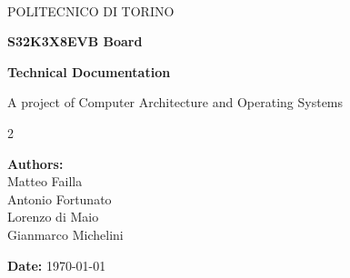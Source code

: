 
\begin{titlepage}
    \

\vspace{20mm}

\begin{center}
    {\LARGE POLITECNICO DI TORINO}
    \vspace{3cm}

    {\LARGE \textbf{S32K3X8EVB Board}}
    \vspace{0.5cm}

    {\LARGE \textbf{Technical Documentation}}
    \vspace{2cm}

    {\large A project of Computer Architecture and Operating Systems}
\end{center}

\vfill

    \begin{multicols}{2}
        \

        \columnbreak

    \begin{flushright}
        \large\textbf{Authors:} \\[5mm] 
        Matteo Failla \\
        Antonio Fortunato \\
        Lorenzo di Maio \\
        Gianmarco Michelini
    \end{flushright}

    \end{multicols}



\vspace{20mm}

\vfill

\begin{flushright}
    \textbf{Date:} \today
\end{flushright}
\end{titlepage}
